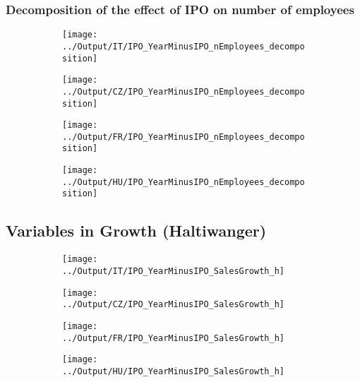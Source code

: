 \documentclass[12pt,notitlepage]{article}
\begin{document}
\subsubsection{Decomposition of the effect of IPO on number of employees}
\begin{figure}[!htpb]
\centering
\caption{IPO and Number of Employees- Decomposition}
\begin{subfigure}{.49\textwidth}
    \centering
 \texttt{[image: ../Output/IT/IPO\_YearMinusIPO\_nEmployees\_decomposition]}
\end{subfigure}%
\begin{subfigure}{.49\textwidth}
    \centering
 \texttt{[image: ../Output/CZ/IPO\_YearMinusIPO\_nEmployees\_decomposition]}
\end{subfigure}
\begin{subfigure}{.49\textwidth}
    \centering
 \texttt{[image: ../Output/FR/IPO\_YearMinusIPO\_nEmployees\_decomposition]}
\end{subfigure}%
\begin{subfigure}{.49\textwidth}
    \centering
 \texttt{[image: ../Output/HU/IPO\_YearMinusIPO\_nEmployees\_decomposition]}
\end{subfigure}
\end{figure}
\pagebreak

\subsection{Variables in Growth  (Haltiwanger)}
\begin{figure}[!htpb]
\centering
\caption{IPO and Sales growth (Haltiwanger)}
\begin{subfigure}{.49\textwidth}
    \centering
 \texttt{[image: ../Output/IT/IPO\_YearMinusIPO\_SalesGrowth\_h]}
\end{subfigure}%
\begin{subfigure}{.49\textwidth}
    \centering
 \texttt{[image: ../Output/CZ/IPO\_YearMinusIPO\_SalesGrowth\_h]}
\end{subfigure}
\begin{subfigure}{.49\textwidth}
    \centering
 \texttt{[image: ../Output/FR/IPO\_YearMinusIPO\_SalesGrowth\_h]}
\end{subfigure}%
\begin{subfigure}{.49\textwidth}
    \centering
 \texttt{[image: ../Output/HU/IPO\_YearMinusIPO\_SalesGrowth\_h]}
\end{subfigure}
\end{figure}
\pagebreak
\end{document}
